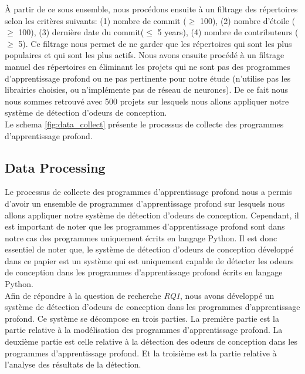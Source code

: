 À partir de ce sous ensemble, nous procédons ensuite à un filtrage des répertoires selon les
critères suivants: (1) nombre de commit ($\geq$ 100), (2) nombre d'étoile ($\geq$ 100), (3) dernière date du
commit($\leq$ 5 years), (4) nombre de contributeurs ($\geq$ 5). Ce filtrage nous permet de ne garder que
les répertoires qui sont les plus populaires et qui sont les plus actifs. Nous
avons ensuite procédé à un filtrage manuel des répertoires en éliminant les
projets qui ne sont pas des programmes d'apprentissage profond ou ne pas
pertinente pour notre étude (n'utilise pas les librairies choisies, ou
n'implémente pas de réseau de neurones). De ce fait nous nous sommes retrouvé
avec 500 projets sur lesquels nous allons appliquer notre système de détection
d'odeurs de conception.\\ Le schema \ref{fig:data_collect} présente le processus
de collecte des programmes d'apprentissage profond.\\








\subsection{Data Processing}
\label{sec:DataProcessing}
Le processus de collecte des programmes d'apprentissage profond nous a permis
d'avoir un ensemble de programmes d'apprentissage profond sur lesquels nous
allons appliquer notre système de détection d'odeurs de conception. Cependant,
il est important de noter que les programmes d'apprentissage profond sont dans
notre cas des programmes uniquement écrits en langage Python. Il est donc
essentiel de noter que, le système de détection d'odeurs de conception développé
dans ce papier est un système qui est uniquement capable de détecter les odeurs de
conception dans les programmes d'apprentissage profond écrits en langage
Python.\\

Afin de répondre à la question de recherche \emph{RQ1}, nous avons développé un système de détection d'odeurs de
conception dans les programmes d'apprentissage profond. Ce système se décompose
en trois parties. La première partie est la partie relative à la
modélisation des programmes d'apprentissage profond. La
deuxième partie est celle relative à la détection des odeurs de conception
dans les programmes d'apprentissage profond. Et la troisième est la partie
relative à l'analyse des résultats de la détection.\\

